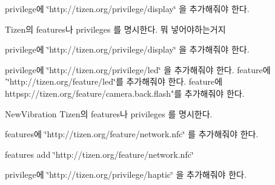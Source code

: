 
\begin{DoxyRefList}
\item[\label{todo__todo000006}%
\hypertarget{todo__todo000006}{}%
클래스 \hyperlink{namespace_3global_scope_4}{Battery} ]privilege에 \char`\"{}http\-://tizen.\-org/privilege/display\char`\"{} 을 추가해줘야 한다.  
\item[\label{todo__todo000008}%
\hypertarget{todo__todo000008}{}%
그룹 \hyperlink{_device_status_8c_amgrp93e9b86e3e7c5fa5cbbbb3eb370a1330}{Device\-Status\-Error\-Check} ]Tizen의 features나 privileges 를 명시한다. 뭐 넣어야하는거지  
\item[\label{todo__todo000005}%
\hypertarget{todo__todo000005}{}%
클래스 \hyperlink{namespace_3global_scope_4}{Display} ]privilege에 \char`\"{}http\-://tizen.\-org/privilege/display\char`\"{} 을 추가해줘야 한다.  
\item[\label{todo__todo000007}%
\hypertarget{todo__todo000007}{}%
클래스 \hyperlink{namespace_3global_scope_4}{Flash} ]privilege에 \char`\"{}http\-://tizen.\-org/privilege/led\char`\"{} 을 추가해줘야 한다. feature에 '\char`\"{}http\-://tizen.\-org/feature/led\char`\"{}를 추가해줘야 한다. feature에 httpsp\-://tizen.org/feature/camera.\-back.\-flash"를 추가해줘야 한다.  
\item[\label{todo__todo000004}%
\hypertarget{todo__todo000004}{}%
전역 \hyperlink{_device_status_8h_a0ec310def9439efd69610eadcd0e9678}{New\-Vibration} (void)]New\-Vibration Tizen의 features나 privileges 를 명시한다.  
\item[\label{todo__todo000001}%
\hypertarget{todo__todo000001}{}%
클래스 \hyperlink{namespace_3global_scope_4}{N\-F\-C} ]features에 \char`\"{}http\-://tizen.\-org/feature/network.\-nfc\char`\"{} 를 추가해줘야 한다.  
\item[\label{todo__todo000002}%
\hypertarget{todo__todo000002}{}%
클래스 \hyperlink{_n_f_c_8h}{N\-F\-C\-Extends} ]features add \char`\"{}http\-://tizen.\-org/feature/network.\-nfc\char`\"{}  
\item[\label{todo__todo000003}%
\hypertarget{todo__todo000003}{}%
클래스 \hyperlink{namespace_3global_scope_4}{Vibration} ]privilege에 \char`\"{}http\-://tizen.\-org/privilege/haptic\char`\"{} 을 추가해줘야 한다. 
\end{DoxyRefList}
